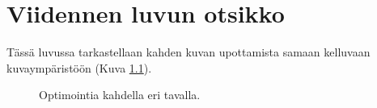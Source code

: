 \chapter{Viidennen luvun otsikko} \label{Viides luku}

Tässä luvussa tarkastellaan kahden kuvan upottamista samaan kelluvaan
kuvaympäristöön (Kuva \ref{fig:Optimointia-kahdella-eri}).

\begin{figure}[tbh]
\caption{Optimointia kahdella eri tavalla.\label{fig:Optimointia-kahdella-eri}}

\end{figure}